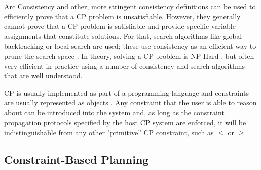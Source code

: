 {Arc Consistency and other, more stringent consistency definitions can
be used to efficiently prove that a \textsf{CP} problem is
unsatisfiable. However, they generally cannot prove that a \textsf{CP}
problem is satisfiable and provide specific variable assignments that
constitute solutions. For that, search algorithms like global
backtracking \cite{hooker05} or local search are used; these use
consistency as an efficient way to prune the search space
\cite{cp06}. In theory, solving a \textsf{CP} problem is NP-Hard
\cite{ghallab04}, but often very efficient in practice using a number
of consistency and search algorithms that are well understood.

\textsf{CP} is usually implemented as part of a programming language
and constraints are usually represented as objects \cite{puget95}. Any
constraint that the user is able to reason about can be introduced
into the system and, as long as the constraint propagation protocols
specified by the host \textsf{CP} system are enforced, it will be
indistinguishable from any other "primitive'' \textsf{CP} constraint,
such as $\leq$ or $\geq$.

\subsection{Constraint-Based Planning}
\label{sec:europa:cp}

}
